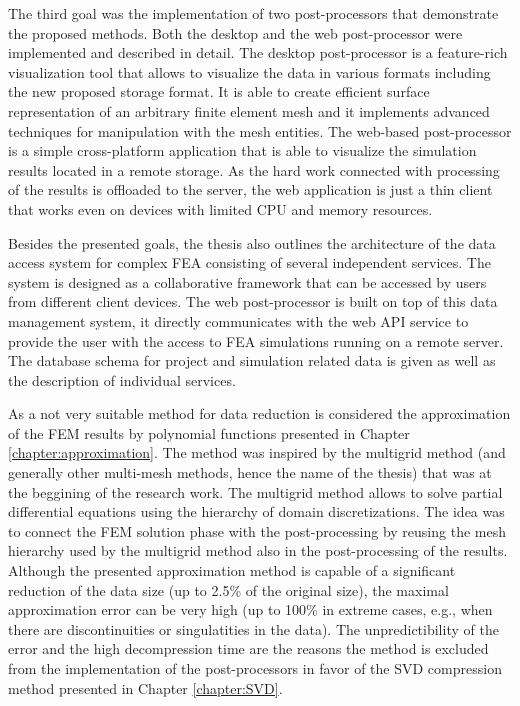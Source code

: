 The third goal was the implementation of two post-processors that demonstrate the proposed methods. Both the desktop and the web post-processor were implemented and described in detail. The desktop post-processor is a feature-rich visualization tool that allows to visualize the data in various formats including the new proposed storage format. It is able to create efficient surface representation of an arbitrary finite element mesh and it implements advanced techniques for manipulation with the mesh entities. The web-based post-processor is a simple cross-platform application that is able to visualize the simulation results located in a remote storage. As the hard work connected with processing of the results is offloaded to the server, the web application is just a thin client that works even on devices with limited CPU and memory resources.

Besides the presented goals, the thesis also outlines the architecture of the data access system for complex FEA consisting of several independent services. The system is designed as a collaborative framework that can be accessed by users from different client devices. The web post-processor is built on top of this data management system, it directly communicates with the web API service to provide the user with the access to FEA simulations running on a remote server. The database schema for project and simulation related data is given as well as the description of individual services.


As a not very suitable method for data reduction is considered the approximation of the FEM results by polynomial functions presented in Chapter \ref{chapter:approximation}. The method was inspired by the multigrid method (and generally other multi-mesh methods, hence the name of the thesis) that was at the beggining of the research work. The multigrid method allows to solve partial differential equations using the hierarchy of domain discretizations. The idea was to connect the FEM solution phase with the post-processing by reusing the mesh hierarchy used by the multigrid method also in the post-processing of the results. Although the presented approximation method is capable of a significant reduction of the data size (up to 2.5\% of the original size), the maximal approximation error can be very high (up to 100\% in extreme cases, e.g., when there are discontinuities or singulatities in the data). The unpredictibility of the error and the high decompression time are the reasons the method is excluded from the implementation of the post-processors in favor of the SVD compression method presented in Chapter \ref{chapter:SVD}.


